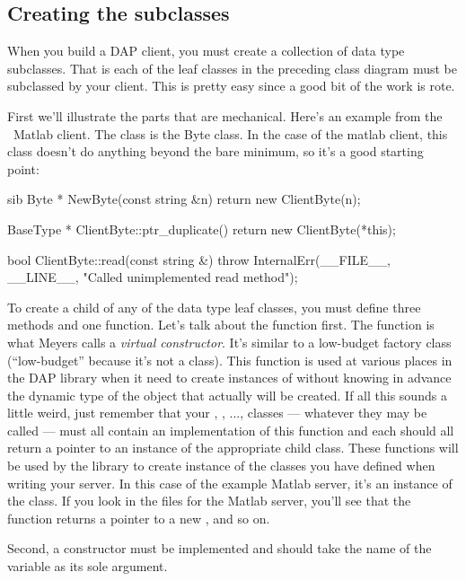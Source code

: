 \documentclass{dods-paper}
\begin{document}
\subsection{Creating the subclasses}

When you build a DAP client, you must create a collection of data type
subclasses.  That is each of the leaf classes in the preceding class
diagram must be subclassed by your client. This is pretty easy since a
good bit of the work is rote.

First we'll illustrate the parts that are mechanical. Here's an example from
the \Cpp\ Matlab client. The class is the Byte class. In the case of the matlab
client, this class doesn't do anything beyond the bare minimum, so it's a
good starting point:

\begin{vcode}{sib}
Byte *
NewByte(const string &n)
{
    return new ClientByte(n);
}

BaseType *
ClientByte::ptr_duplicate()
{
    return new ClientByte(*this);
}

bool
ClientByte::read(const string &)
{
  throw InternalErr(__FILE__, __LINE__, "Called unimplemented read method");
}
\end{vcode}

To create a child of any of the data type leaf classes, you must define three
methods and one function. Let's talk about the function first. The function
 is what Meyers\cite{meyers:ecpp} calls a \emph{virtual
constructor}. It's similar to a low-budget factory class (``low-budget''
because it's not a class). This function is used at various places in the DAP
library when it need to create instances of  without knowing in
advance the dynamic type of the object that actually will be created. If all
this sounds a little weird, just remember that your , ,
...,  classes --- whatever they may be called --- must all contain
an implementation of this function and each should all return a pointer to an
instance of the appropriate child class. These functions will be used by the
library to create instance of the classes you have defined when writing your
server. In this case of the example Matlab server, it's an instance of the
 class. If you look in the files for the Matlab server, you'll
see that the function  returns a pointer to a new ,
and so on.

Second, a constructor must be implemented and should take the name of the
variable as its sole argument.
\end{document}
